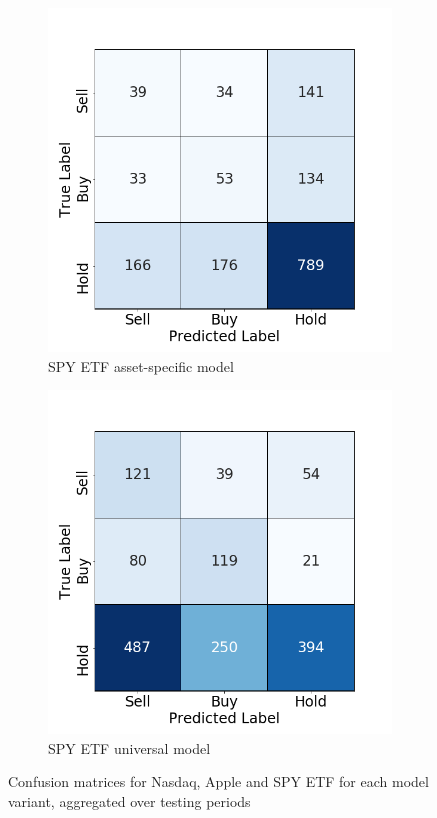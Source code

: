 \documentclass[11pt, a4paper]{article}
\begin{document}
\begin{figure}[H]
\begin{subfigure}{.5\textwidth}
  \centering
  \includegraphics[width=.75\linewidth]{images/CMs/CM_indiv_SPY.png}  
  \caption{SPY ETF asset-specific model}
  \label{fig:subSPYI}
\end{subfigure}
\begin{subfigure}{.5\textwidth}
  \centering
  \includegraphics[width=.75\linewidth]{images/CMs/CM_univ_SPY.png}  
  \caption{SPY ETF universal model}
  \label{fig:subSPYU}
\end{subfigure}

\caption{Confusion matrices for Nasdaq, Apple and SPY ETF for each  model variant, aggregated over testing periods}
\label{fig:AppCMs2}
\end{figure}
\end{document}

